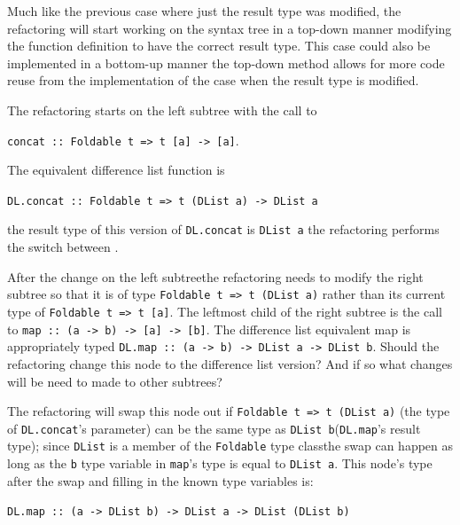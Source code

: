 Much like the previous case where just the result type was modified, the refactoring will start working on the syntax tree in a top-down manner modifying the function definition to have the correct result type. This case could also be implemented in a bottom-up manner \DIFaddbegin {}\DIFaddend the top-down method allows for more code reuse from the implementation of the case when the result type is modified.

The refactoring starts on the left subtree with the call to\DIFaddbegin \DIFadd{: 
}

\DIFaddend \texttt{concat :: Foldable t => t [a] -> [a]}. 
\DIFaddbegin 

\DIFaddend The equivalent difference list function is\DIFaddbegin \DIFadd{: 
}

\DIFaddend \texttt{DL.concat :: Foldable t => t (DList a) -> DList a} 
\DIFdelbegin {}\DIFdelend \DIFaddbegin 

\DIFaddend the result type of this version of \texttt{DL.concat} is \texttt{DList a} the refactoring performs the switch between \DIFdelbegin {}\DIFdelend \DIFaddbegin {}\DIFaddend . 

After the change on the left subtree\DIFaddbegin \DIFadd{, }\DIFaddend the refactoring needs to modify the right subtree so that it is of type \texttt{Foldable t => t (DList a)} rather than its current type of \texttt{Foldable t => t [a]}. The leftmost child of the right subtree is the call to \texttt{map :: (a -> b) -> [a] -> [b]}. The difference list equivalent map is appropriately typed \texttt{DL.map :: (a -> b) -> DList a -> DList b}. Should the refactoring change this node to the difference list version? And if so what changes will be need to made to other subtrees?

The refactoring will swap this node out if \texttt{Foldable t => t (DList a)} (the type of \texttt{DL.concat}'s parameter) can be the same type as \texttt{DList b}\DIFaddbegin \DIFadd{~}\DIFaddend (\texttt{DL.map}'s result type); since \texttt{DList} is a member of the \texttt{Foldable} type class\DIFaddbegin \DIFadd{, }\DIFaddend the swap can happen as long as the \texttt{b} type variable in \texttt{map}'s type is equal to \texttt{DList a}. This node's type after the swap and filling in the known type variables is: 
\DIFaddbegin 

\DIFaddend \texttt{DL.map :: (a -> DList b) -> DList a -> DList (DList b)}
\DIFdelbegin {}\DIFdelend \DIFaddbegin 

